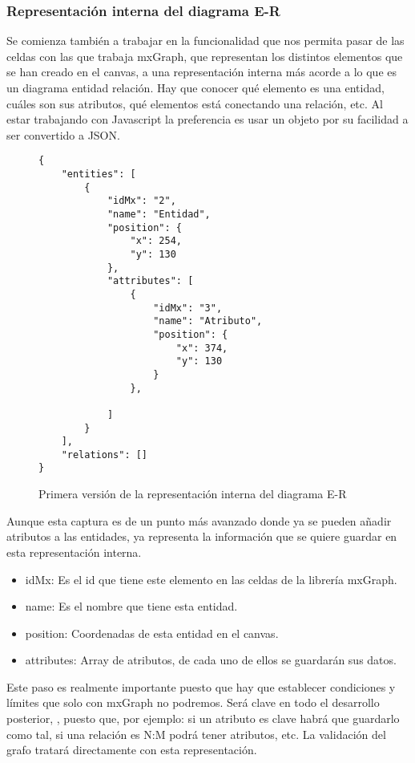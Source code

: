 
\subsubsection{Representación interna del diagrama E-R}
Se comienza también a trabajar en la funcionalidad que nos permita pasar de las celdas con las que trabaja mxGraph, que representan los distintos elementos que se han creado en el canvas, a una representación interna más acorde a lo que es un diagrama entidad relación. Hay que conocer qué elemento es una entidad, cuáles son sus atributos, qué elementos está conectando una relación, etc.
Al estar trabajando con Javascript la preferencia es usar un objeto por su facilidad a ser convertido a JSON.

\begin{figure}
\lstset{breaklines=true, basicstyle=\footnotesize}
\begin{lstlisting}[frame=single]
{
    "entities": [
        {
            "idMx": "2",
            "name": "Entidad",
            "position": {
                "x": 254,
                "y": 130
            },
            "attributes": [
                {
                    "idMx": "3",
                    "name": "Atributo",
                    "position": {
                        "x": 374,
                        "y": 130
                    }
                },

            ]
        }
    ],
    "relations": []
}
\end{lstlisting}
\caption{Primera versión de la representación interna del diagrama E-R}
\end{figure}

Aunque esta captura es de un punto más avanzado donde ya se pueden añadir atributos a las entidades, ya representa la información que se quiere guardar en esta representación interna.
\begin{itemize}\tightlist
    \item idMx: Es el id que tiene este elemento en las celdas de la librería mxGraph.
    \item name: Es el nombre que tiene esta entidad.
    \item position: Coordenadas de esta entidad en el canvas.
    \item attributes: Array de atributos, de cada uno de ellos se guardarán sus datos.
\end{itemize}
Este paso es realmente importante puesto que hay que establecer condiciones y límites que solo con mxGraph no podremos. Será clave en todo el desarrollo posterior, , puesto que, por ejemplo: si un atributo es clave habrá que guardarlo como tal,
si una relación es N:M podrá tener atributos, etc. La validación del grafo tratará directamente con esta representación.

